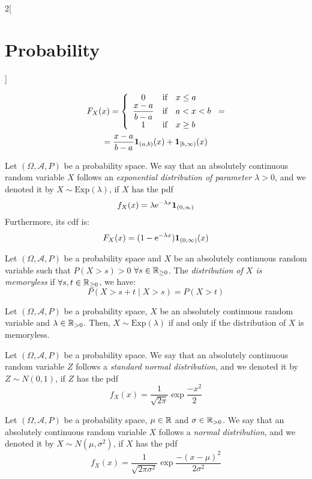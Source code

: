\documentclass[../../../main.tex]{subfiles}
\begin{document}
\begin{multicols}{2}[\section{Probability}]
\begin{definition}
\begin{multline*}
      F_X(x)=\left\{
      \begin{array}{ccl}
        0                            & \text{if} & x\leq a \\
        \displaystyle\frac{x-a}{b-a} & \text{if} & a<x<b   \\
        1                            & \text{if} & x\geq b \\
      \end{array}
      \right.=\\=\frac{x-a}{b-a}\boldsymbol{\mathrm{1}}_{(a,b)}(x)+\boldsymbol{\mathrm{1}}_{[b,\infty)}(x)
    \end{multline*}
  \end{definition}
  \begin{definition}
    Let $(\Omega,\mathcal{A},P)$ be a probability space. We say that an absolutely continuous random variable $X$ follows an \textit{exponential distribution of parameter $\lambda>0$}, and we denoted it by $X\sim \text{Exp}(\lambda)$, if $X$ has the pdf $$f_X(x)=\lambda\mathrm{e}^{-\lambda x}\boldsymbol{\mathrm{1}}_{(0,\infty)}$$ Furthermore, its cdf is:
    $$F_X(x)=(1-\mathrm{e}^{-\lambda x})\boldsymbol{\mathrm{1}}_{(0,\infty)}(x)$$
  \end{definition}
  \begin{definition}
    Let $(\Omega,\mathcal{A},P)$ be a probability space and $X$ be an absolutely continuous random variable such that $P(X >s)>0$ $\forall s\in\mathbb{R}_{\geq 0}$. The \textit{distribution of $X$ is memoryless} if $\forall s,t\in\mathbb{R}_{\geq 0}$, we have: $$P(X>s+t\mid X >s)=P(X>t)$$
  \end{definition}
  \begin{prop}
    Let $(\Omega,\mathcal{A},P)$ be a probability space, $X$ be an absolutely continuous random variable and $\lambda\in\mathbb{R}_{>0}$. Then, $X\sim\text{Exp}(\lambda)$ if and only if the distribution of $X$ is memoryless.
  \end{prop}
  \begin{definition}
    Let $(\Omega,\mathcal{A},P)$ be a probability space. We say that an absolutely continuous random variable $Z$ follows a \textit{standard normal distribution}, and we denoted it by $Z\sim N(0,1)$, if $Z$ has the pdf $$f_X(x)=\frac{1}{\sqrt{2\pi}}\exp{\frac{-x^2}{2}}$$
  \end{definition}
  \begin{definition}
    Let $(\Omega,\mathcal{A},P)$ be a probability space, $\mu\in\mathbb{R}$ and $\sigma\in\mathbb{R}_{>0}$. We say that an absolutely continuous random variable $X$ follows a \textit{normal distribution}, and we denoted it by $X\sim N(\mu,\sigma^2)$, if $X$ has the pdf $$f_X(x)=\frac{1}{\sqrt{2\pi\sigma^2}}\exp{\frac{-{(x-\mu)}^2}{2\sigma^2}}$$

\end{definition}
\end{multicols}
\end{document}
